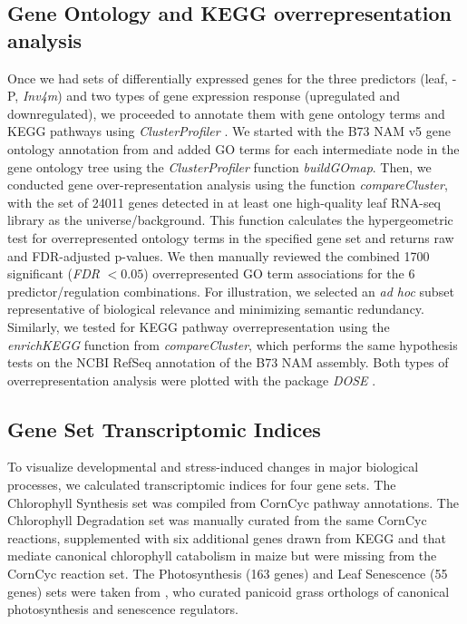 \documentclass[9pt,twocolumn,twoside]{rilabRxiv}
\newcommand{\invfour}{\textit{Inv4m}\xspace}
\begin{document}
\subsection*{Gene Ontology and KEGG overrepresentation analysis}

Once we had sets of differentially expressed genes for the three predictors (leaf, -P, \invfour) and two types of gene expression response (upregulated and downregulated), we proceeded to annotate them with gene ontology terms and KEGG pathways using \textit{ClusterProfiler} \cite{yu2012,zicola2024}.  
We started with the B73 NAM v5 gene ontology annotation from \cite{fattel2024} and added GO terms for each intermediate node in the gene ontology tree using the \textit{ClusterProfiler} function \textit{buildGOmap}. 
Then, we conducted gene over-representation analysis using the function \textit{compareCluster}, with the set of 24011 genes detected in at least one high-quality leaf RNA-seq library as the universe/background. 
This function calculates the hypergeometric test for overrepresented ontology terms in the specified gene set and returns raw and FDR-adjusted p-values.
We then manually reviewed the combined 1700 significant (\textit{FDR} $<0.05$) overrepresented GO term associations for the 6 predictor/regulation combinations. For illustration, we selected an \textit{ad hoc} subset representative of biological relevance and minimizing semantic redundancy.
Similarly, we tested for KEGG pathway overrepresentation using the \textit{enrichKEGG} function from \textit{compareCluster}, which performs the same hypothesis tests on the NCBI RefSeq annotation of the B73 NAM assembly. 
Both types of overrepresentation analysis were plotted with the package \textit{DOSE} \cite{yu2015}.

\subsection*{Gene Set Transcriptomic Indices}
To visualize developmental and stress-induced changes in major biological processes, we calculated transcriptomic indices for four gene sets.
The Chlorophyll Synthesis set was compiled from CornCyc pathway annotations.
The Chlorophyll Degradation set was manually curated from the same CornCyc reactions, supplemented with six additional genes drawn from KEGG and \cite{wei2025} that mediate canonical chlorophyll catabolism in maize but were missing from the CornCyc reaction set.
The Photosynthesis (163 genes) and Leaf Senescence (55 genes) sets were taken from \cite{ojedarivera2026}, who curated panicoid grass orthologs of canonical photosynthesis and senescence regulators.
\end{document}
